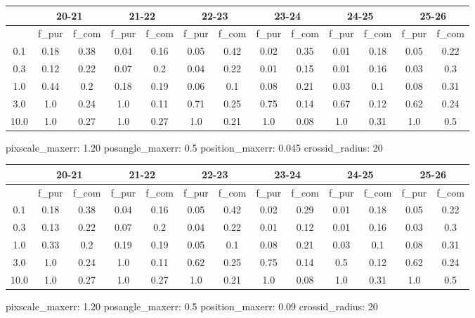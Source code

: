 \documentclass{article}
\begin{document}
\begin{figure}[H]
\centering
\begin{tabular}{|c|c|c|c|c|c|c|c|c|c|c|c|c|}
\hline
\multicolumn{1}{|c|}{} & \multicolumn{2}{|c|}{20-21} & \multicolumn{2}{|c|}{21-22} & \multicolumn{2}{|c|}{22-23} & \multicolumn{2}{|c|}{23-24} & \multicolumn{2}{|c|}{24-25} & \multicolumn{2}{|c|}{25-26}\\
\hline \hline
 & f\_pur & f\_com & f\_pur & f\_com & f\_pur & f\_com & f\_pur & f\_com & f\_pur & f\_com & f\_pur & f\_com \\
\hline
0.1 & 0.18 & 0.38 & 0.04 & 0.16 & 0.05 & 0.42 & 0.02 & 0.35 & 0.01 & 0.18 & 0.05 & 0.22\\
\hline
0.3 & 0.12 & 0.22 & 0.07 & 0.2 & 0.04 & 0.22 & 0.01 & 0.15 & 0.01 & 0.16 & 0.03 & 0.3\\
\hline
1.0 & 0.44 & 0.2 & 0.18 & 0.19 & 0.06 & 0.1 & 0.08 & 0.21 & 0.03 & 0.1 & 0.08 & 0.31\\
\hline
3.0 & 1.0 & 0.24 & 1.0 & 0.11 & 0.71 & 0.25 & 0.75 & 0.14 & 0.67 & 0.12 & 0.62 & 0.24\\
\hline
10.0 & 1.0 & 0.27 & 1.0 & 0.27 & 1.0 & 0.21 & 1.0 & 0.08 & 1.0 & 0.31 & 1.0 & 0.5\\
\hline
\end{tabular}
\caption{pixscale\_maxerr: 1.20 posangle\_maxerr: 0.5 position\_maxerr: 0.045 crossid\_radius: 20}
\end{figure}

\begin{figure}[H]
\centering
\begin{tabular}{|c|c|c|c|c|c|c|c|c|c|c|c|c|}
\hline
\multicolumn{1}{|c|}{} & \multicolumn{2}{|c|}{20-21} & \multicolumn{2}{|c|}{21-22} & \multicolumn{2}{|c|}{22-23} & \multicolumn{2}{|c|}{23-24} & \multicolumn{2}{|c|}{24-25} & \multicolumn{2}{|c|}{25-26}\\
\hline \hline
 & f\_pur & f\_com & f\_pur & f\_com & f\_pur & f\_com & f\_pur & f\_com & f\_pur & f\_com & f\_pur & f\_com \\
\hline
0.1 & 0.18 & 0.38 & 0.04 & 0.16 & 0.05 & 0.42 & 0.02 & 0.29 & 0.01 & 0.18 & 0.05 & 0.22\\
\hline
0.3 & 0.13 & 0.22 & 0.07 & 0.2 & 0.04 & 0.22 & 0.01 & 0.12 & 0.01 & 0.16 & 0.03 & 0.3\\
\hline
1.0 & 0.33 & 0.2 & 0.19 & 0.19 & 0.05 & 0.1 & 0.08 & 0.21 & 0.03 & 0.1 & 0.08 & 0.31\\
\hline
3.0 & 1.0 & 0.24 & 1.0 & 0.11 & 0.62 & 0.25 & 0.75 & 0.14 & 0.5 & 0.12 & 0.62 & 0.24\\
\hline
10.0 & 1.0 & 0.27 & 1.0 & 0.27 & 1.0 & 0.21 & 1.0 & 0.08 & 1.0 & 0.31 & 1.0 & 0.5\\
\hline
\end{tabular}
\caption{pixscale\_maxerr: 1.20 posangle\_maxerr: 0.5 position\_maxerr: 0.09 crossid\_radius: 20}
\end{figure}
\end{document}
